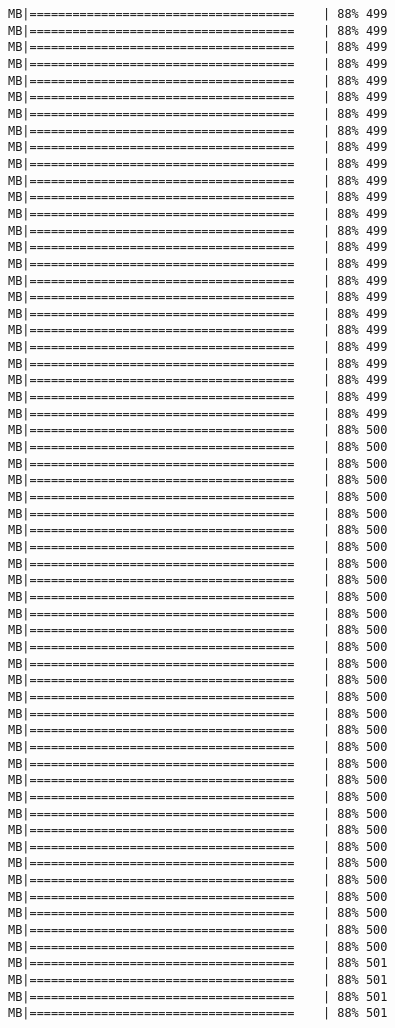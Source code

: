 \documentclass[
]{article}
\begin{document}
\begin{verbatim}
MB|=====================================    | 88% 499 MB|=====================================    | 88% 499 MB|=====================================    | 88% 499 MB|=====================================    | 88% 499 MB|=====================================    | 88% 499 MB|=====================================    | 88% 499 MB|=====================================    | 88% 499 MB|=====================================    | 88% 499 MB|=====================================    | 88% 499 MB|=====================================    | 88% 499 MB|=====================================    | 88% 499 MB|=====================================    | 88% 499 MB|=====================================    | 88% 499 MB|=====================================    | 88% 499 MB|=====================================    | 88% 499 MB|=====================================    | 88% 499 MB|=====================================    | 88% 499 MB|=====================================    | 88% 499 MB|=====================================    | 88% 499 MB|=====================================    | 88% 499 MB|=====================================    | 88% 499 MB|=====================================    | 88% 499 MB|=====================================    | 88% 499 MB|=====================================    | 88% 499 MB|=====================================    | 88% 499 MB|=====================================    | 88% 500 MB|=====================================    | 88% 500 MB|=====================================    | 88% 500 MB|=====================================    | 88% 500 MB|=====================================    | 88% 500 MB|=====================================    | 88% 500 MB|=====================================    | 88% 500 MB|=====================================    | 88% 500 MB|=====================================    | 88% 500 MB|=====================================    | 88% 500 MB|=====================================    | 88% 500 MB|=====================================    | 88% 500 MB|=====================================    | 88% 500 MB|=====================================    | 88% 500 MB|=====================================    | 88% 500 MB|=====================================    | 88% 500 MB|=====================================    | 88% 500 MB|=====================================    | 88% 500 MB|=====================================    | 88% 500 MB|=====================================    | 88% 500 MB|=====================================    | 88% 500 MB|=====================================    | 88% 500 MB|=====================================    | 88% 500 MB|=====================================    | 88% 500 MB|=====================================    | 88% 500 MB|=====================================    | 88% 500 MB|=====================================    | 88% 500 MB|=====================================    | 88% 500 MB|=====================================    | 88% 500 MB|=====================================    | 88% 500 MB|=====================================    | 88% 500 MB|=====================================    | 88% 500 MB|=====================================    | 88% 501 MB|=====================================    | 88% 501 MB|=====================================    | 88% 501 MB|=====================================    | 88% 501 
\end{verbatim}
\end{document}
